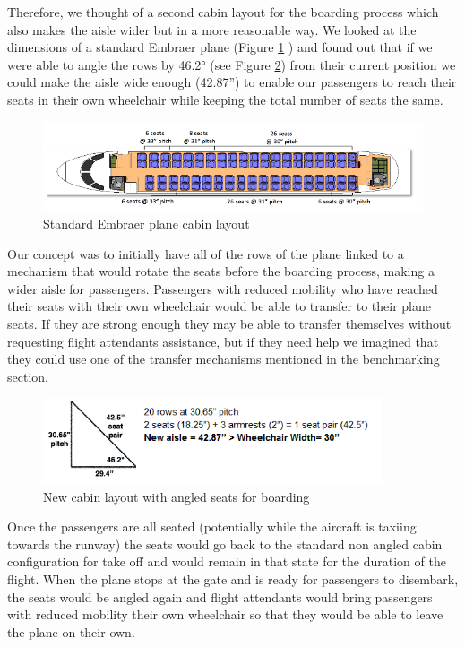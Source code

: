 Therefore, we thought of a second cabin layout for the boarding process which also makes the aisle wider but in a more reasonable way. We looked at the dimensions of a standard Embraer plane (Figure \ref{fig:embraer_plane} ) and found out that if we were able to angle the rows by 46.2° (see Figure \ref{fig:angled_seats}) from their current position we could make the aisle wide enough (42.87'') to enable our passengers to reach their seats in their own wheelchair while keeping the total number of seats the same.

\begin{figure}[h]
  \centering
     \includegraphics[width=12cm]{images/embraer_plane.png}
   \caption{Standard Embraer plane cabin layout}
  \label{fig:embraer_plane}
\end{figure}

Our concept was to initially have all of the rows of the plane linked to a mechanism that would rotate the seats before the boarding process, making a wider aisle for passengers. Passengers with reduced mobility who have reached their seats with their own wheelchair would be able to transfer to their plane seats. If they are strong enough they may be able to transfer themselves without requesting flight attendants assistance, but if they need help we imagined that they could use one of the transfer mechanisms mentioned in the benchmarking section.
\begin{figure}[h]
  \centering
     \includegraphics[width=10cm]{images/angled_seats.png}
   \caption{New cabin layout with angled seats for boarding}
  \label{fig:angled_seats}
\end{figure}

Once the passengers are all seated (potentially while the aircraft is taxiing towards the runway) the seats would go back to the standard non angled cabin configuration for take off and would remain in that state for the duration of the flight. When the plane stops at the gate and is ready for passengers to disembark, the seats would be angled again and flight attendants would bring passengers with reduced mobility their own wheelchair so that they would be able to leave the plane on their own. 

